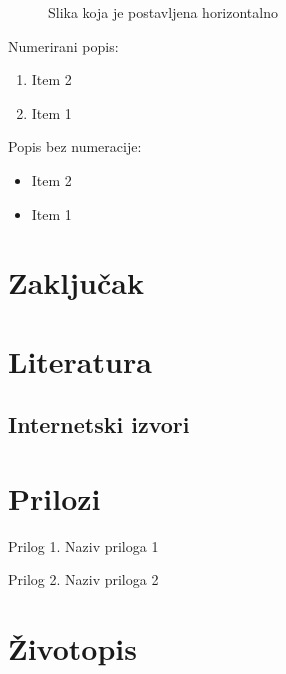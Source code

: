 \documentclass[12pt, oneside, a4paper, hidelinks]{report}
\begin{document}
	\begin{figure}
		\centering
		\caption{Slika koja je postavljena horizontalno}
		\label{slika_horizontalno}
	\end{figure}
	
	Numerirani popis:
	\begin{enumerate}
		\item Item 2 
		\item Item 1
	\end{enumerate} 
	
	Popis bez numeracije:
	\begin{itemize}
		\item Item 2 
		\item Item 1
	\end{itemize}
	
	\chapter{Zaključak}
	\thispagestyle{fancy}
	
	\label{endOfWrittenWork}
	
	\chapter*{Literatura}
	\thispagestyle{fancy}
	\printbibliography[notkeyword=url,heading=none]
	
	\section*{Internetski izvori}
	\thispagestyle{fancy}
	\begin{refcontext}[sorting=none]
		\printbibliography[env=bibliographyURL,keyword=url,resetnumbers=true,heading=none]
	\end{refcontext}
	
	\newpage
	\listoffigures
	\thispagestyle{fancy}
	
	\newpage
	\listoftables
	\thispagestyle{fancy}
	
	\chapter*{Prilozi}
	\thispagestyle{fancy}
	Prilog 1. Naziv priloga 1
	\label{prilog1}
	
	Prilog 2. Naziv priloga 2
	\label{prilog2}
	
	\chapter*{Životopis}
	\thispagestyle{fancy}
\end{document}
